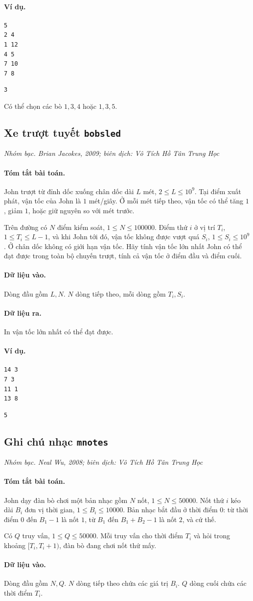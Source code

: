 \documentclass[11pt]{article}
\newcommand{\problem}[4]{%
  \subsection[#1 (#2)]{#1 \hfill {\normalsize\texttt{#2}}}%
  \noindent\textit{#3. #4}\par\smallskip
}
\newcommand{\iosec}[1]{\paragraph{#1}}
\begin{document}
\iosec{Ví dụ.}
\begin{verbatim}
5
2 4
1 12
4 5
7 10
7 8
\end{verbatim}

\begin{verbatim}
3
\end{verbatim}

Có thể chọn các bò \(1,3,4\) hoặc \(1,3,5\).

\problem{Xe trượt tuyết}{bobsled}{Nhóm bạc}{Brian Jacokes, 2009; biên dịch: Vô Tích Hồ Tân Trung Học}

\iosec{Tóm tắt bài toán.}
John trượt từ đỉnh dốc xuống chân dốc dài \(L\) mét,
\(2\le L\le 10^9\). Tại điểm xuất phát, vận tốc của John là \(1\) mét/giây.
Ở mỗi mét tiếp theo, vận tốc có thể tăng \(1\), giảm \(1\), hoặc giữ nguyên
so với mét trước.

Trên đường có \(N\) điểm kiểm soát, \(1\le N\le 100000\). Điểm thứ \(i\) ở
vị trí \(T_i\), \(1\le T_i\le L-1\), và khi John tới đó, vận tốc không được
vượt quá \(S_i\), \(1\le S_i\le 10^9\). Ở chân dốc không có giới hạn vận tốc.
Hãy tính vận tốc lớn nhất John có thể đạt được trong toàn bộ chuyến trượt,
tính cả vận tốc ở điểm đầu và điểm cuối.

\iosec{Dữ liệu vào.}
Dòng đầu gồm \(L,N\). \(N\) dòng tiếp theo, mỗi dòng gồm \(T_i,S_i\).

\iosec{Dữ liệu ra.}
In vận tốc lớn nhất có thể đạt được.

\iosec{Ví dụ.}
\begin{verbatim}
14 3
7 3
11 1
13 8
\end{verbatim}

\begin{verbatim}
5
\end{verbatim}

\problem{Ghi chú nhạc}{mnotes}{Nhóm bạc}{Neal Wu, 2008; biên dịch: Vô Tích Hồ Tân Trung Học}

\iosec{Tóm tắt bài toán.}
John dạy đàn bò chơi một bản nhạc gồm \(N\) nốt, \(1\le N\le 50000\). Nốt
thứ \(i\) kéo dài \(B_i\) đơn vị thời gian, \(1\le B_i\le 10000\). Bản nhạc
bắt đầu ở thời điểm \(0\): từ thời điểm \(0\) đến \(B_1-1\) là nốt \(1\), từ
\(B_1\) đến \(B_1+B_2-1\) là nốt \(2\), và cứ thế.

Có \(Q\) truy vấn, \(1\le Q\le 50000\). Mỗi truy vấn cho thời điểm \(T_i\)
và hỏi trong khoảng \([T_i,T_i+1)\), đàn bò đang chơi nốt thứ mấy.

\iosec{Dữ liệu vào.}
Dòng đầu gồm \(N,Q\). \(N\) dòng tiếp theo chứa các giá trị \(B_i\). \(Q\)
dòng cuối chứa các thời điểm \(T_i\).
\end{document}
